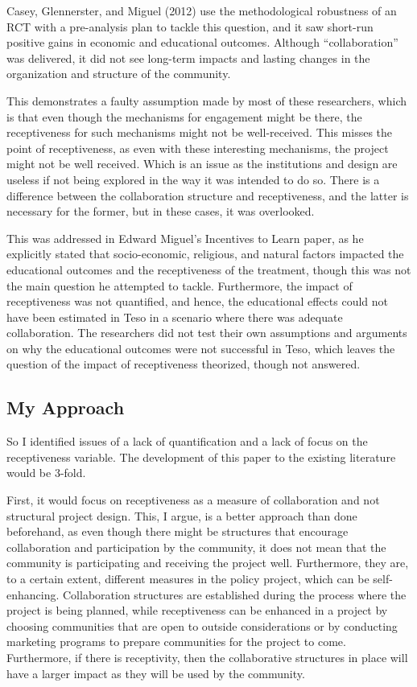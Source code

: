 \documentclass{article}
\begin{document}
Casey, Glennerster, and Miguel (2012) use the methodological robustness of an RCT with a pre-analysis plan to tackle this question, and it saw short-run positive gains in economic and educational outcomes.\autocite[]{casey-glennerster-miguel-2012} Although “collaboration” was delivered, it did not see long-term impacts and lasting changes in the organization and structure of the community. 
	
This demonstrates a faulty assumption made by most of these researchers, which is that even though the mechanisms for engagement might be there, the receptiveness for such mechanisms might not be well-received. This misses the point of receptiveness, as even with these interesting mechanisms, the project might not be well received. Which is an issue as the institutions and design are useless if not being explored in the way it was intended to do so. There is a difference between the collaboration structure and receptiveness, and the latter is necessary for the former, but in these cases, it was overlooked. 

This was addressed in Edward Miguel's Incentives to Learn paper, as he explicitly stated that socio-economic, religious, and natural factors impacted the educational outcomes and the receptiveness of the treatment, though this was not the main question he attempted to tackle.\autocite[]{kremer-miguel-thornton-2009} Furthermore, the impact of receptiveness was not quantified, and hence, the educational effects could not have been estimated in Teso in a scenario where there was adequate collaboration. The researchers did not test their own assumptions and arguments on why the educational outcomes were not successful in Teso, which leaves the question of the impact of receptiveness theorized, though not answered.

\subsection{My Approach}
So I identified issues of a lack of quantification and a lack of focus on the receptiveness variable. The development of this paper to the existing literature would be 3-fold. 

First, it would focus on receptiveness as a measure of collaboration and not structural project design. This, I argue, is a better approach than done beforehand, as even though there might be structures that encourage collaboration and participation by the community, it does not mean that the community is participating and receiving the project well. Furthermore, they are, to a certain extent, different measures in the policy project, which can be self-enhancing. Collaboration structures are established during the process where the project is being planned, while receptiveness can be enhanced in a project by choosing communities that are open to outside considerations or by conducting marketing programs to prepare communities for the project to come. Furthermore, if there is receptivity, then the collaborative structures in place will have a larger impact as they will be used by the community. 
\end{document}
